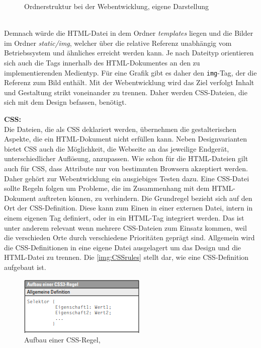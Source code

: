 \documentclass[a4paper,titlepage,halfparskip,12pt]{scrreprt}
\begin{document}
\begin{onehalfspacing}
\begin{figure}[h]
	\caption{Ordnerstruktur bei der Webentwicklung, eigene Darstellung} 
	\label{img:TreeHTMLStruktur}
\end{figure}
\\Demnach würde die \ac{HTML}-Datei in dem Ordner \textit{templates} liegen und die Bilder im Ordner \textit{static/img}, welcher über die relative Referenz unabhängig vom Betriebssystem und ähnliches erreicht werden kann. Je nach Dateityp orientieren sich auch die Tags innerhalb des \ac{HTML}-Dokumentes an den zu implementierenden Medientyp. Für eine Grafik gibt es daher den \texttt{img}-Tag, der die Referenz zum Bild enthält. Mit der Webentwicklung wird das Ziel verfolgt Inhalt und Gestaltung strikt voneinander zu trennen. Daher werden \ac{CSS}-Dateien, die sich mit dem Design befassen, benötigt.\cite{buhler2017html5}

\textbf{CSS:}\\
Die Dateien, die als \ac{CSS} deklariert werden, übernehmen die gestalterischen Aspekte, die ein \ac{HTML}-Dokument nicht erfüllen kann. Neben Designvarianten bietet \ac{CSS} auch die Möglichkeit, die Webseite an das jeweilige Endgerät, unterschiedlicher Auflösung, anzupassen. Wie schon für die \ac{HTML}-Dateien gilt auch für \ac{CSS}, dass Attribute nur von bestimmten Browsern akzeptiert werden. Daher gehört zur Webentwicklung ein ausgiebiges Testen dazu. Eine \ac{CSS}-Datei sollte Regeln folgen um Probleme, die im Zusammenhang mit dem HTML-Dokument auftreten können, zu verhindern. Die Grundregel bezieht sich auf den Ort der \ac{CSS}-Definition. Diese kann zum Einen in einer externen Datei, intern in einem eigenen Tag definiert, oder in ein \ac{HTML}-Tag integriert werden. Das ist unter anderem relevant wenn mehrere \ac{CSS}-Dateien zum Einsatz kommen, weil die verschieden Orte durch verschiedene Prioritäten geprägt sind. Allgemein wird die \ac{CSS}-Definitionen in eine eigene Datei ausgelagert um das Design und die \ac{HTML}-Datei zu trennen. Die \autoref{img:CSSrules} stellt dar, wie eine \ac{CSS}-Definition aufgebaut ist.
\begin{figure}[h]
	\centering
	\includegraphics[scale=2.5]{images/CSS_Definition}
	\caption{Aufbau einer \ac{CSS}-Regel, \cite{buhler2017html5}}
	\label{img:CSSrules}
\end{figure}	

\end{onehalfspacing}
\end{document}
